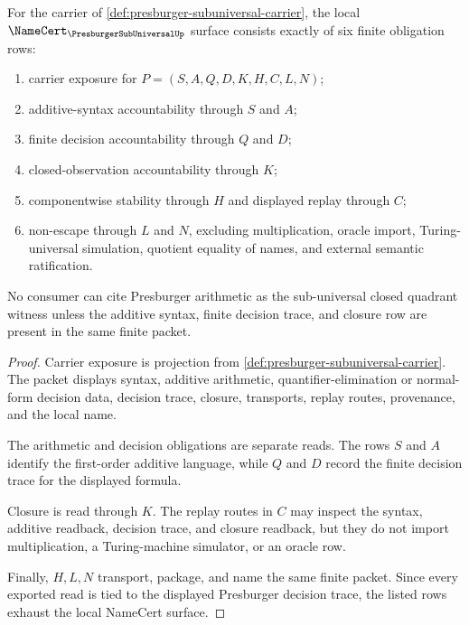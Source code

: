 \begin{theorem}
\label{thm:presburger-closed-observation-namecert-obligations}
For the carrier of \autoref{def:presburger-subuniversal-carrier}, the local $\NameCert_{\PresburgerSubUniversalUp}$ surface consists exactly of six finite obligation rows:
\begin{enumerate}
\item carrier exposure for $P=(S,A,Q,D,K,H,C,L,N)$;
\item additive-syntax accountability through $S$ and $A$;
\item finite decision accountability through $Q$ and $D$;
\item closed-observation accountability through $K$;
\item componentwise stability through $H$ and displayed replay through $C$;
\item non-escape through $L$ and $N$, excluding multiplication, oracle import, Turing-universal simulation, quotient equality of names, and external semantic ratification.
\end{enumerate}
No consumer can cite Presburger arithmetic as the sub-universal closed quadrant witness unless the additive syntax, finite decision trace, and closure row are present in the same finite packet.
\end{theorem}
\begin{proof}
Carrier exposure is projection from \autoref{def:presburger-subuniversal-carrier}. The packet displays syntax, additive arithmetic, quantifier-elimination or normal-form decision data, decision trace, closure, transports, replay routes, provenance, and the local name.

The arithmetic and decision obligations are separate reads. The rows $S$ and $A$ identify the first-order additive language, while $Q$ and $D$ record the finite decision trace for the displayed formula.

Closure is read through $K$. The replay routes in $C$ may inspect the syntax, additive readback, decision trace, and closure readback, but they do not import multiplication, a Turing-machine simulator, or an oracle row.

Finally, $H,L,N$ transport, package, and name the same finite packet. Since every exported read is tied to the displayed Presburger decision trace, the listed rows exhaust the local NameCert surface.
\end{proof}

